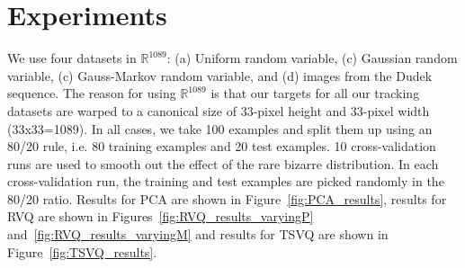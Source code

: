 
\section{Experiments}
We use four datasets in $\mathbb{R}^{1089}$: (a) Uniform random variable, (c) Gaussian random variable, (c) Gauss-Markov random variable, and (d) images from the Dudek sequence.  The reason for using $\mathbb{R}^{1089}$ is that our targets for all our tracking datasets are warped to a canonical size of 33-pixel height and 33-pixel width (33x33=1089).  In all cases, we take 100 examples and split them up using an 80/20 rule, i.e. 80 training examples and 20 test examples.  10 cross-validation runs are used to smooth out the effect of the rare bizarre distribution.  In each cross-validation run, the training and test examples are picked randomly in the 80/20 ratio.  Results for PCA are shown in Figure~\ref{fig:PCA_results},  results for RVQ are shown in Figures~\ref{fig:RVQ_results_varyingP} and~\ref{fig:RVQ_results_varyingM} and results for TSVQ are shown in Figure~\ref{fig:TSVQ_results}.



